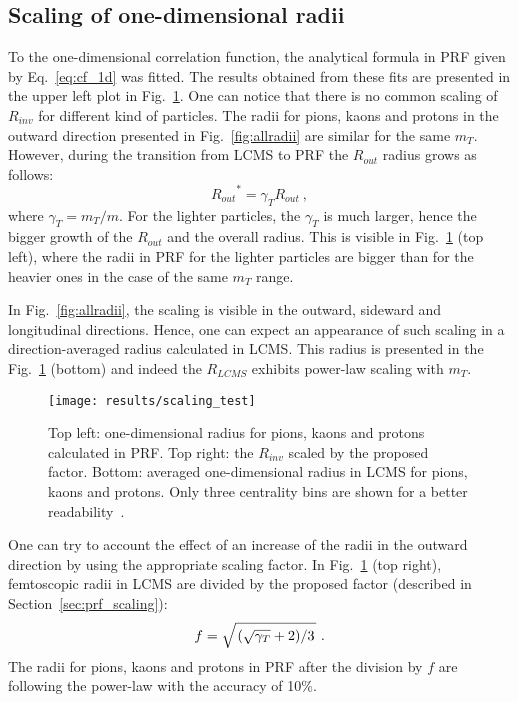       \subsection{Scaling of one-dimensional radii}
      To the one-dimensional correlation function, the analytical formula in PRF given by Eq.~\ref{eq:cf_1d} was fitted.
      The results obtained from these fits are presented in the upper left plot in Fig.~\ref{fig:scaling_test}.
      One can notice that there is no common scaling of $R_{inv}$ for different kind of particles.
      The radii for pions, kaons and protons in the outward direction presented in Fig.~\ref{fig:allradii} are similar for the same $m_T$.
      However, during the transition from LCMS to PRF the $R_{out}$ radius grows as follows:
      \begin{equation}
        {R_{out}}^{*} = \gamma_T R_{out}~,
      \end{equation}
      where $\gamma_T = m_T / m$.
      For the lighter particles, the $\gamma_T$ is much larger, hence the bigger growth of the $R_{out}$ and the overall radius.
      This is visible in Fig.~\ref{fig:scaling_test} (top left), where the radii in PRF for the lighter particles are bigger than for the heavier ones in the case of the same $m_T$ range.

      In Fig.~\ref{fig:allradii}, the scaling is visible in the outward, sideward and longitudinal directions.
      Hence, one can expect an appearance of such scaling in a direction-averaged radius calculated in LCMS.
      This radius is presented in the Fig.~\ref{fig:scaling_test} (bottom) and indeed the $R_{LCMS}$ exhibits power-law scaling with $m_T$.

      \begin{figure}[b]
        \centering
        \centerline{\texttt{[image: results/scaling\_test]}}
        \caption{Top left: one-dimensional radius for pions, kaons and protons calculated in PRF. Top right: the $R_{inv}$ scaled by the proposed factor. Bottom: averaged one-dimensional radius in LCMS for pions, kaons and protons. Only three centrality bins are shown for a better readability~\cite{galazyn}.}
      \label{fig:scaling_test}
      \end{figure}

      One can try to account the effect of an increase of the radii in the outward direction by using the appropriate scaling factor.
      In Fig.~\ref{fig:scaling_test} (top right), femtoscopic radii in LCMS are divided by the proposed factor (described in Section~\ref{sec:prf_scaling}):
      \begin{equation}
        f = \sqrt{ \left. \left( \sqrt{\gamma_T} + 2 \right) \middle/ 3 \right. }~.
      \end{equation}
      The radii for pions, kaons and protons in PRF after the division by $f$ are following the power-law with the accuracy of 10\%.

